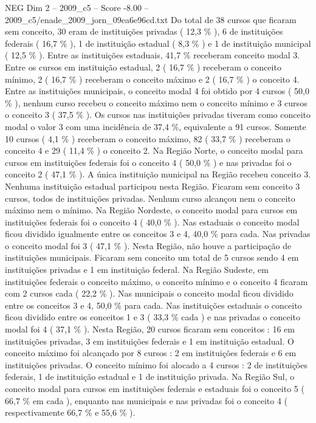 \begin{textsample}{NEG Dim 2 – 2009\_c5 – Score -8.00 – 2009\_c5/enade\_2009\_jorn\_09ea6e96cd.txt}
Do total de 38 cursos que ficaram sem conceito, 30 eram de instituições privadas ( 12,3 \% ), 6 de instituições federais ( 16,7 \% ), 1 de instituição estadual ( 8,3 \% ) e 1 de instituição municipal ( 12,5 \% ).
Entre as instituições estaduais, 41,7 \% receberam conceito modal 3.
Entre os cursos em instituição estadual, 2 ( 16,7 \% ) receberam o conceito mínimo, 2 ( 16,7 \% ) receberam o conceito máximo e 2 ( 16,7 \% ) o conceito 4.
Entre as instituições municipais, o conceito modal 4 foi obtido por 4 cursos ( 50,0 \% ), nenhum curso recebeu o conceito máximo nem o conceito mínimo e 3 cursos o conceito 3 ( 37,5 \% ).
Os cursos nas instituições privadas tiveram como conceito modal o valor 3 com uma incidência de 37,4 \%, equivalente a 91 cursos.
Somente 10 cursos ( 4,1 \% ) receberam o conceito máximo, 82 ( 33,7 \% ) receberam o conceito 4 e 29 ( 11,4 \% ) o conceito 2.
Na Região Norte, o conceito modal para cursos em instituições federais foi o conceito 4 ( 50,0 \% ) e nas privadas foi o conceito 2 ( 47,1 \% ).
A única instituição municipal na Região recebeu conceito 3.
Nenhuma instituição estadual participou nesta Região.
Ficaram sem conceito 3 cursos, todos de instituições privadas.
Nenhum curso alcançou nem o conceito máximo nem o mínimo.
Na Região Nordeste, o conceito modal para cursos em instituições federais foi o conceito 4 ( 40,0 \% ).
Nas estaduais o conceito modal ficou dividido igualmente entre os conceitos 3 e 4, 40,0 \% para cada.
Nas privadas o conceito modal foi 3 ( 47,1 \% ).
Nesta Região, não houve a participação de instituições municipais.
Ficaram sem conceito um total de 5 cursos sendo 4 em instituições privadas e 1 em instituição federal.
Na Região Sudeste, em instituições federais o conceito máximo, o conceito mínimo e o conceito 4 ficaram com 2 cursos cada ( 22,2 \% ).
Nas municipais o conceito modal ficou dividido entre os conceitos 3 e 4, 50,0 \% para cada.
Nas instituições estaduais o conceito ficou dividido entre os conceitos 1 e 3 ( 33,3 \% cada ) e nas privadas o conceito modal foi 4 ( 37,1 \% ).
Nesta Região, 20 cursos ficaram sem conceitos : 16 em instituições privadas, 3 em instituições federais e 1 em instituição estadual.
O conceito máximo foi alcançado por 8 cursos : 2 em instituições federais e 6 em instituições privadas.
O conceito mínimo foi alocado a 4 cursos : 2 de instituições federais, 1 de instituição estadual e 1 de instituição privada.
Na Região Sul, o conceito modal para cursos em instituições federais e estaduais foi o conceito 5 ( 66,7 \% em cada ), enquanto nas municipais e nas privadas foi o conceito 4 ( respectivamente 66,7 \% e 55,6 \% ).

\end{textsample}
